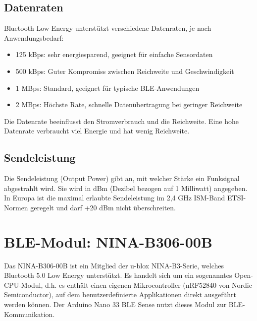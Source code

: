 \subsection{Datenraten}
Bluetooth Low Energy unterstützt verschiedene Datenraten, je nach Anwendungsbedarf:
\begin{itemize}
	\item 125 kBps: sehr energiesparend, geeignet für einfache Sensordaten
	\item 500 kBps: Guter Kompromiss zwischen Reichweite und Geschwindigkeit
	\item 1 MBps: Standard, geeignet für typische BLE-Anwendungen
	\item 2 MBps: Höchste Rate, schnelle Datenübertragung bei geringer Reichweite 
\end{itemize}
Die Datenrate beeinflusst den Stromverbrauch und die Reichweite. Eine hohe Datenrate verbraucht viel Energie und hat wenig Reichweite. \cite{Tosi:2017}

\subsection{Sendeleistung}
Die Sendeleistung (Output Power) gibt an, mit welcher Stärke ein Funksignal abgestrahlt wird. Sie wird in dBm (Dezibel bezogen auf 1 Milliwatt) angegeben. In Europa ist die maximal erlaubte Sendeleistung im 2,4 GHz ISM-Band ETSI-Normen geregelt und darf +20 dBm nicht überschreiten. \cite{ETSI:2004}

\section{BLE-Modul: NINA-B306-00B}
Das NINA-B306-00B ist ein Mitglied der u-blox NINA-B3-Serie, welches Bluetooth 5.0 Low Energy unterstützt. Es handelt sich um ein sogenanntes Open-CPU-Modul, d.h. es enthält einen eigenen Mikrocontroller (nRF52840 von Nordic Semiconductor), auf dem benutzerdefinierte Applikationen direkt ausgeführt werden können. Der Arduino Nano 33 BLE Sense nutzt dieses Modul zur BLE-Kommunikation. \cite{Tosi:2017} \cite{UBLOX:2023}


